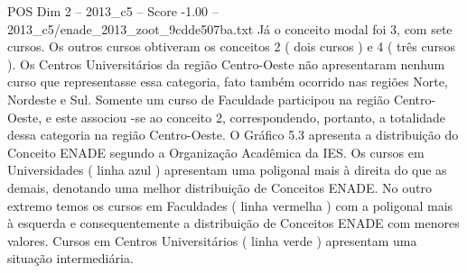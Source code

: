 \begin{textsample}{POS Dim 2 – 2013\_c5 – Score -1.00 – 2013\_c5/enade\_2013\_zoot\_9cdde507ba.txt}
Já o conceito modal foi 3, com sete cursos.
Os outros cursos obtiveram os conceitos 2 ( dois cursos ) e 4 ( três cursos ).
Os Centros Universitários da região Centro-Oeste não apresentaram nenhum curso que representasse essa categoria, fato também ocorrido nas regiões Norte, Nordeste e Sul.
Somente um curso de Faculdade participou na região Centro-Oeste, e este associou -se ao conceito 2, correspondendo, portanto, a totalidade dessa categoria na região Centro-Oeste.
O Gráfico 5.3 apresenta a distribuição do Conceito ENADE segundo a Organização Acadêmica da IES.
Os cursos em Universidades ( linha azul ) apresentam uma poligonal mais à direita do que as demais, denotando uma melhor distribuição de Conceitos ENADE.
No outro extremo temos os cursos em Faculdades ( linha vermelha ) com a poligonal mais à esquerda e consequentemente a distribuição de Conceitos ENADE com menores valores.
Cursos em Centros Universitários ( linha verde ) apresentam uma situação intermediária.

\end{textsample}
